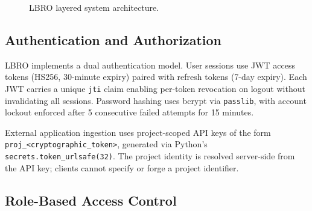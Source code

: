 \documentclass[conference]{IEEEtran}
\begin{document}
\begin{figure}[h]
\centering
{}
\caption{LBRO layered system architecture.}
\label{fig:architecture}
\end{figure}

\subsection{Authentication and Authorization}

LBRO implements a dual authentication model. User sessions use JWT access tokens (HS256, 30-minute expiry) paired with refresh tokens (7-day expiry). Each JWT carries a unique \texttt{jti} claim enabling per-token revocation on logout without invalidating all sessions. Password hashing uses bcrypt via \texttt{passlib}, with account lockout enforced after 5 consecutive failed attempts for 15 minutes.

External application ingestion uses project-scoped API keys of the form \texttt{proj\_<cryptographic\_token>}, generated via Python's \texttt{secrets.token\_urlsafe(32)}. The project identity is resolved server-side from the API key; clients cannot specify or forge a project identifier.

\subsection{Role-Based Access Control}
\end{document}
